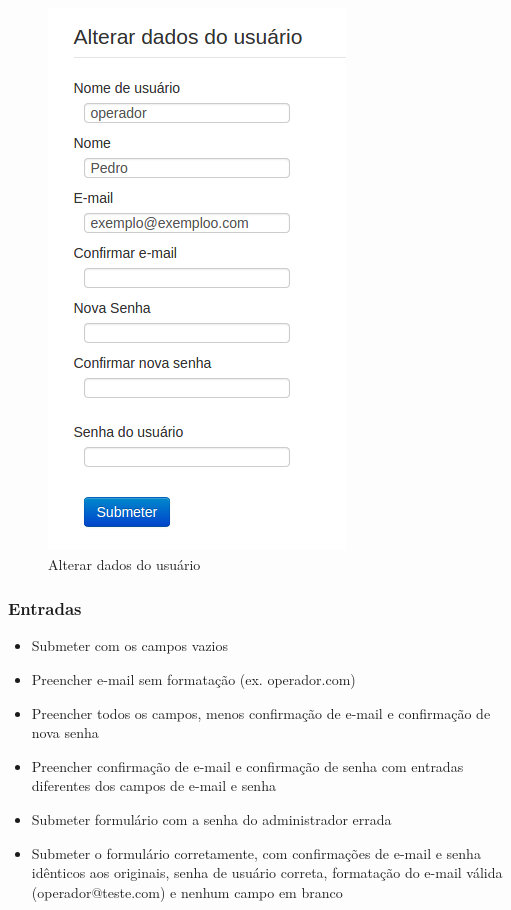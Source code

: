 \begin{figure}[ht]
    \centering
     \includegraphics[scale=0.7]{images/alterardadosop.png}
     \caption{Alterar dados do usuário}
     \label{fig:alterarop}
\end{figure}

\subsubsection{Entradas}

\begin{itemize}

	\item Submeter com os campos vazios 
	\item Preencher e-mail sem formatação (ex. operador.com)
	\item Preencher todos os campos, menos confirmação de e-mail e confirmação de nova senha
	\item Preencher confirmação de e-mail e confirmação de senha com entradas diferentes dos campos de e-mail e senha
	\item Submeter formulário com a senha do administrador errada
	\item Submeter o formulário corretamente, com confirmações de e-mail e senha idênticos aos originais, senha de usuário correta, formatação do e-mail válida (operador@teste.com) e nenhum campo em branco
	
\end{itemize}

